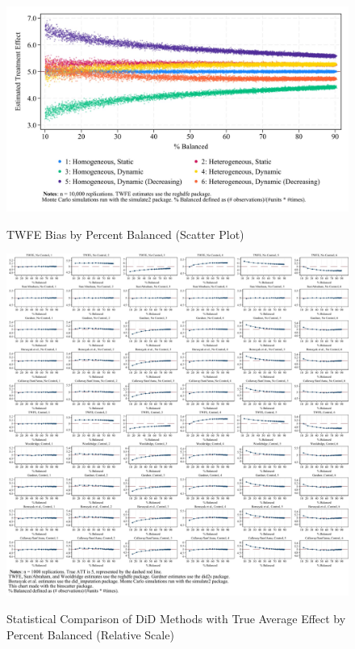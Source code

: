 \documentclass[12pt]{article}
\begin{document}
\begin{figure}
    \centering
    \caption{TWFE Bias by Percent Balanced (Scatter Plot)}
    \includegraphics[width=5in]{Figures/TWFE Bias by Percent Balanced Scatter Crop.jpg}
    \label{fig:scatter-balance}
\end{figure}

\begin{figure}
    \centering
    \caption{Statistical Comparison of DiD Methods with True Average Effect by Percent Balanced (Relative Scale)}
    \includegraphics[width=6in]{Figures/Binscatters by Percent Balanced Relative Scale.jpg}
    \label{fig:bins-relative}
\end{figure}
\end{document}
